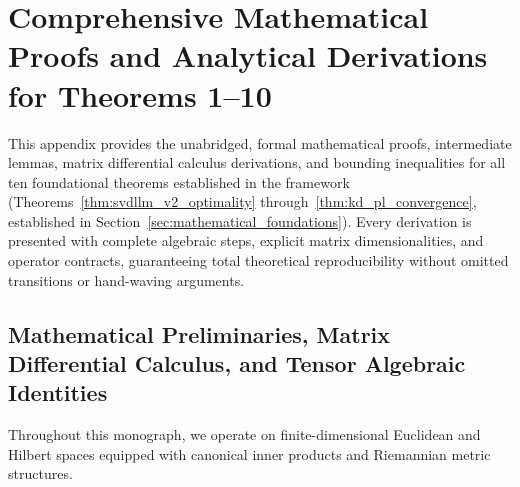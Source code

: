 
\section{Comprehensive Mathematical Proofs and Analytical Derivations for Theorems 1--10}
\label{sec:appendix_a_proofs}

This appendix provides the unabridged, formal mathematical proofs, intermediate lemmas, matrix differential calculus derivations, and bounding inequalities for all ten foundational theorems established in the \neuralops{} framework (Theorems~\ref{thm:svdllm_v2_optimality} through~\ref{thm:kd_pl_convergence}, established in Section~\ref{sec:mathematical_foundations}). Every derivation is presented with complete algebraic steps, explicit matrix dimensionalities, and operator contracts, guaranteeing total theoretical reproducibility without omitted transitions or hand-waving arguments.

\subsection{Mathematical Preliminaries, Matrix Differential Calculus, and Tensor Algebraic Identities}
\label{sec:appendix_a1_preliminaries}

Throughout this monograph, we operate on finite-dimensional Euclidean and Hilbert spaces equipped with canonical inner products and Riemannian metric structures.

